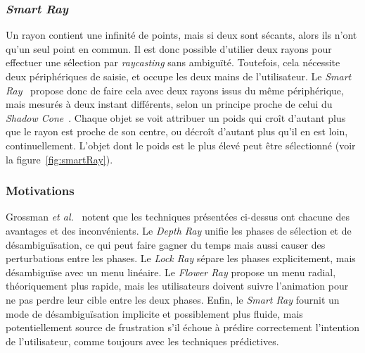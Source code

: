 	\subsubsection{\emph{Smart Ray}}
	Un rayon contient une infinité de points, mais si deux sont sécants, alors ils n'ont qu'un seul point en commun. Il est donc possible d'utilier deux rayons pour effectuer une sélection par \emph{raycasting} sans ambiguïté. Toutefois, cela nécessite deux périphériques de saisie, et occupe les deux mains de l'utilisateur.	Le \emph{Smart Ray}~\cite{grossman2006design} propose donc de faire cela avec deux rayons issus du même périphérique, mais mesurés à deux instant différents, selon un principe proche de celui du \emph{Shadow Cone}~\cite{steed20043d}. Chaque objet se voit attribuer un \og poids \fg{} qui croît d'autant plus que le rayon est proche de son centre, ou décroît d'autant plus qu'il en est loin, continuellement. L'objet dont le poids est le plus élevé peut être sélectionné (voir la figure~\ref{fig:smartRay}).
	
	\subsubsection{Motivations}
	Grossman \emph{et al.}~\cite{grossman2006design} notent que les techniques présentées ci-dessus ont chacune des avantages et des inconvénients. Le \emph{Depth Ray} unifie les phases de sélection et de désambiguïsation, ce qui peut faire gagner du temps mais aussi causer des perturbations entre les phases. Le \emph{Lock Ray} sépare les phases explicitement, mais désambiguïse avec un menu linéaire. Le \emph{Flower Ray} propose un menu radial, théoriquement plus rapide, mais les utilisateurs doivent suivre l'animation pour ne pas perdre leur cible entre les deux phases. Enfin, le \emph{Smart Ray} fournit un mode de désambiguïsation implicite et possiblement plus fluide, mais potentiellement source de frustration s'il échoue à prédire correctement l'intention de l'utilisateur, comme toujours avec les techniques prédictives.
	
